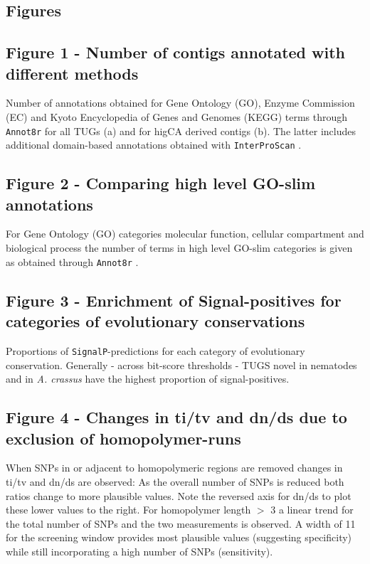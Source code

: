 \documentclass[10pt]{bmc_article}
\newenvironment{bmcformat}{\begin{raggedright}\baselineskip20pt\sloppy\setboolean{publ}{false}}{\end{raggedright}\baselineskip20pt\sloppy}
\begin{document}
\begin{bmcformat}

\section*{Figures}

\subsection*{Figure 1 - Number of contigs annotated with different
  methods}
 
Number of annotations obtained for Gene Ontology (GO), Enzyme
Commission (EC) and Kyoto Encyclopedia of Genes and Genomes (KEGG)
terms through \texttt{Annot8r} \cite{schmid_annot8r:_2008} for all
TUGs (a) and for higCA derived contigs (b). The latter includes
additional domain-based annotations obtained with
\texttt{InterProScan} \cite{pmid11590104}.

\subsection*{Figure 2 - Comparing high level GO-slim annotations}

For Gene Ontology (GO) categories molecular function, cellular
compartment and biological process the number of terms in high level
GO-slim categories is given as obtained through \texttt{Annot8r}
\cite{schmid_annot8r:_2008}.

\subsection*{Figure 3 - Enrichment of Signal-positives for categories
  of evolutionary conservations}

Proportions of \texttt{SignalP}-predictions for each category of
evolutionary conservation. Generally - across bit-score thresholds -
TUGS novel in nematodes and in \textit{A. crassus} have the highest
proportion of signal-positives.


\subsection*{Figure 4 - Changes in ti/tv and dn/ds due to exclusion of
  homopolymer-runs}

When SNPs in or adjacent to homopolymeric regions are removed changes
in ti/tv and dn/ds are observed: As the overall number of SNPs is
reduced both ratios change to more plausible values. Note the reversed
axis for dn/ds to plot these lower values to the right. For
homopolymer length $>$ 3 a linear trend for the total number of SNPs
and the two measurements is observed. A width of 11 for the screening
window provides most plausible values (suggesting specificity) while
still incorporating a high number of SNPs (sensitivity).


\end{bmcformat}
\end{document}
